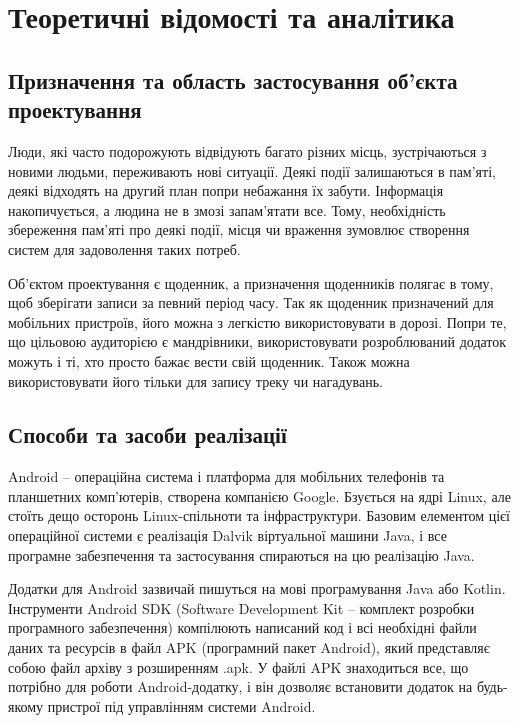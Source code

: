 \documentclass[../main.tex]{subfiles}
\begin{document}
\chapter{Теоретичні відомості та аналітика}

\section{Призначення та область застосування об'єкта проектування}

Люди, які часто подорожують відвідують багато різних місць, зустрічаються з новими людьми, переживають нові ситуації. Деякі події залишаються в пам'яті, деякі відходять на другий план попри небажання їх забути. Інформація накопичується, а людина не в змозі запам'ятати все. Тому, необхідність збереження пам'яті про деякі події, місця чи враження зумовлює створення систем для задоволення таких потреб.

Об'єктом проектування є щоденник, а призначення щоденників полягає в тому, щоб зберігати записи за певний період часу. Так як щоденник призначений для мобільних пристроїв, його можна з легкістю використовувати в дорозі. Попри те, що цільовою аудиторією є мандрівники, використовувати розроблюваний додаток можуть і ті, хто просто бажає вести свій щоденник. Також можна використовувати його тільки для запису треку чи нагадувань.

\section{Способи та засоби реалізації}

Android -- операційна система і платформа для мобільних телефонів та планшетних комп'ютерів, створена компанією Google. Бзується на ядрі Linux, але стоїть дещо осторонь Linux-спільноти та інфраструктури. Базовим елементом цієї операційної системи є реалізація Dalvik віртуальної машини Java, і все програмне забезпечення та застосування спираються на цю реалізацію Java.

Додатки для Android зазвичай пишуться на мові програмування Java або Kotlin. Інструменти Android SDK (Software Development Kit -- комплект розробки програмного забезпечення) компілюють написаний код і всі необхідні файли даних та ресурсів в файл APK (програмний пакет Android), який представляє собою файл архіву з розширенням .apk. У файлі APK знаходиться все, що потрібно для роботи Android-додатку, і він дозволяє встановити додаток на будь-якому пристрої під управлінням системи Android. 
\end{document}
